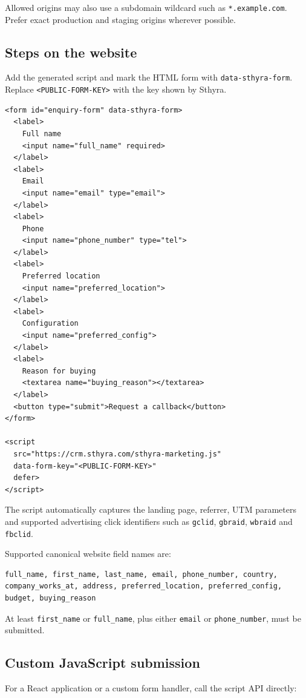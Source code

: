 \documentclass[11pt,a4paper]{article}
\newcommand{\code}[1]{\texttt{#1}}
\newcommand{\placeholder}[1]{\texttt{<#1>}}
\begin{document}
Allowed origins may also use a subdomain wildcard such as \code{*.example.com}. Prefer exact production and staging origins wherever possible.

\subsection{Steps on the website}

Add the generated script and mark the HTML form with \code{data-sthyra-form}. Replace \placeholder{PUBLIC-FORM-KEY} with the key shown by Sthyra.

\begin{lstlisting}
<form id="enquiry-form" data-sthyra-form>
  <label>
    Full name
    <input name="full_name" required>
  </label>
  <label>
    Email
    <input name="email" type="email">
  </label>
  <label>
    Phone
    <input name="phone_number" type="tel">
  </label>
  <label>
    Preferred location
    <input name="preferred_location">
  </label>
  <label>
    Configuration
    <input name="preferred_config">
  </label>
  <label>
    Reason for buying
    <textarea name="buying_reason"></textarea>
  </label>
  <button type="submit">Request a callback</button>
</form>

<script
  src="https://crm.sthyra.com/sthyra-marketing.js"
  data-form-key="<PUBLIC-FORM-KEY>"
  defer>
</script>
\end{lstlisting}

The script automatically captures the landing page, referrer, UTM parameters and supported advertising click identifiers such as \code{gclid}, \code{gbraid}, \code{wbraid} and \code{fbclid}.

Supported canonical website field names are:

\begin{lstlisting}
full_name, first_name, last_name, email, phone_number, country,
company_works_at, address, preferred_location, preferred_config,
budget, buying_reason
\end{lstlisting}

At least \code{first\_name} or \code{full\_name}, plus either \code{email} or \code{phone\_number}, must be submitted.

\subsection{Custom JavaScript submission}

For a React application or a custom form handler, call the script API directly:
\end{document}
